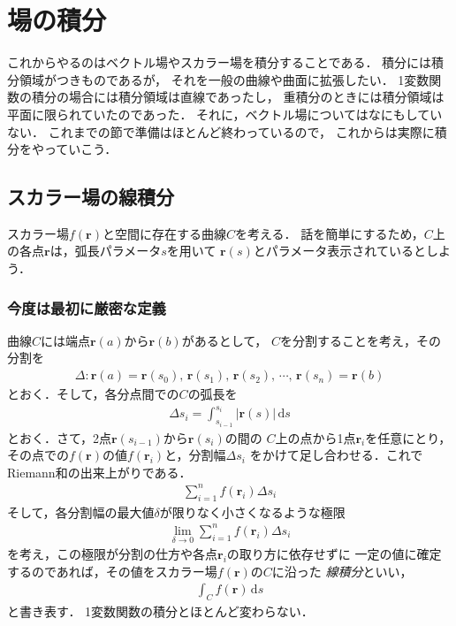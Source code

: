 \section{場の積分}
これからやるのはベクトル場やスカラー場を積分することである．
積分には積分領域がつきものであるが，
それを一般の曲線や曲面に拡張したい．
1変数関数の積分の場合には積分領域は直線であったし，
重積分のときには積分領域は平面に限られていたのであった．
それに，ベクトル場についてはなにもしていない．
これまでの節で準備はほとんど終わっているので，
これからは実際に積分をやっていこう．

\subsection{スカラー場の線積分}

スカラー場$f(\bm{r})$と空間に存在する曲線$C$を考える．
話を簡単にするため，$C$上の各点$\bm{r}$は，弧長パラメータ$s$を用いて
$\bm{r}(s)$とパラメータ表示されているとしよう．
\subsubsection{今度は最初に厳密な定義}
曲線$C$には端点$\bm{r}(a)$から$\bm{r}(b)$があるとして，
$C$を分割することを考え，その分割を
\begin{align*}
\Delta : \bm{r}(a) = \bm{r}(s_0), \, \bm{r}(s_1), \, \bm{r}(s_2), \, \cdots , \, \bm{r}(s_n) = \bm{r}(b)
\end{align*}
とおく．そして，各分点間での$C$の弧長を
\begin{align*}
\varDelta s_i = \int _{s_{i-1} } ^{s_i} \lvert \bm{r} (s) \rvert \, \mathrm{d}s 
\end{align*}
とおく．さて，2点$\bm{r}(s_{i-1})$から$\bm{r}(s_i)$の間の
$C$上の点から1点$\bm{r}_i$を任意にとり，
その点での$f(\bm{r})$の値$f( \bm{r}_i )$と，分割幅$\varDelta s_i$
をかけて足し合わせる．これでRiemann和の出来上がりである．
\begin{align*}
\sum_{i=1}^n f(\bm{r}_i) \varDelta s_i
\end{align*}
そして，各分割幅の最大値$\delta$が限りなく小さくなるような極限
\begin{align*}
\lim _{\delta \to 0} \sum_{i=1}^n f(\bm{r}_i) \varDelta s_i
\end{align*}
を考え，この極限が分割の仕方や各点$\bm{r}_i$の取り方に依存せずに
一定の値に確定するのであれば，その値をスカラー場$f(\bm{r})$の$C$に沿った
\emph{線積分}といい，
\begin{align*}
\int_C f(\bm{r}) \, \mathrm{d} s 
 \end{align*}
と書き表す．
1変数関数の積分とほとんど変わらない．
